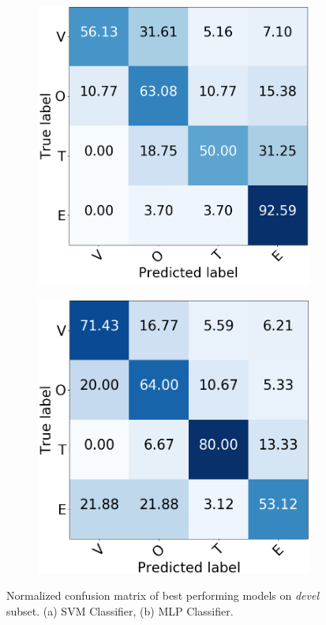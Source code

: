 \begin{figure}[h]
	\centering	
	\begin{subfigure}{.4\textwidth}
		\includegraphics[width=\linewidth]{img/cm_devel_svm.png}
		\caption{}
		\label{fig:cm_devel_svm}
	\end{subfigure}
	\begin{subfigure}{.4\textwidth}
		\includegraphics[width=\linewidth]{img/cm_devel_mlp.png}
		\caption{}
		\label{fig:cm_devel_mlp}
	\end{subfigure}
	\caption[VOTE Classification - Devel set results]{Normalized confusion matrix of best performing models on \textit{devel} subset. (a) SVM Classifier, (b) MLP Classifier.} 
	\label{fig:cm_devel}
\end{figure}


